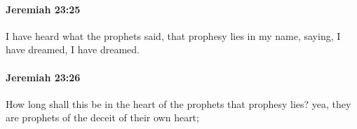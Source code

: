 		\paragraph{Jeremiah 23:25} %
			\label{JEREMIAH-23-25}

			I have heard what the prophets said, that prophesy lies in my name, saying, I have dreamed, I have dreamed.


		\paragraph{Jeremiah 23:26} %
			\label{JEREMIAH-23-26}

			How long shall this be in the heart of the prophets that prophesy lies? yea, they are prophets of the deceit of their own heart;


